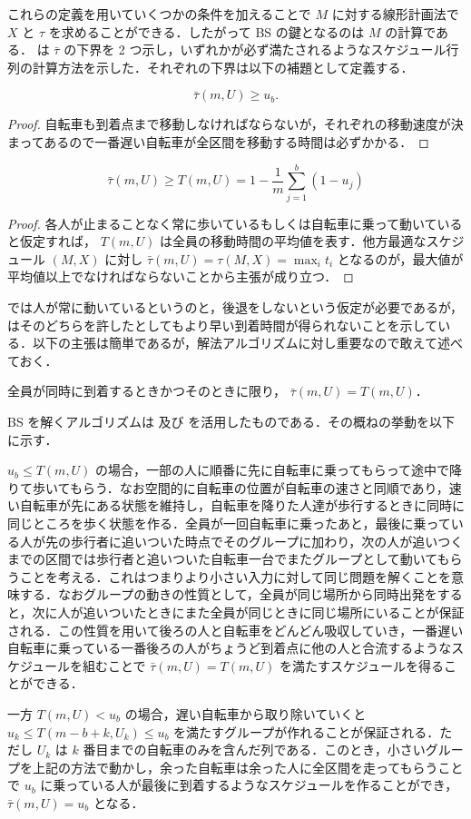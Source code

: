 これらの定義を用いていくつかの条件を加えることで $M$ に対する線形計画法で $X$ と $\tau$ を求めることができる．したがって BS の鍵となるのは $M$ の計算である． \textcite{czyzowicz} は $\bar\tau$ の下界を 2 つ示し，いずれかが必ず満たされるようなスケジュール行列の計算方法を示した．それぞれの下界は以下の補題として定義する．

\begin{lemma}
  \begin{equation}
    \bar\tau(m, U) \geq u_b.
  \end{equation}
\end{lemma}
\begin{proof}
  自転車も到着点まで移動しなければならないが，それぞれの移動速度が決まってあるので一番遅い自転車が全区間を移動する時間は必ずかかる．
\end{proof}

\begin{lemma}\label{lemma:lower-bound-bs}
  \begin{equation}
    \bar\tau(m, U) \geq T(m, U) = 1 - \frac{1}{m}\sum_{j = 1}^b(1 - u_j)
  \end{equation}
\end{lemma}
\begin{proof}
  各人が止まることなく常に歩いているもしくは自転車に乗って動いていると仮定すれば， $T(m, U)$ は全員の移動時間の平均値を表す．他方最適なスケジュール $(M, X)$ に対し $\bar\tau(m, U) = \tau(M, X) = \max_i t_i$ となるのが，最大値が平均値以上でなければならないことから主張が成り立つ．
\end{proof}
 では人が常に動いているというのと，後退をしないという仮定が必要であるが，\textcite{czyzowicz} はそのどちらを許したとしてもより早い到着時間が得られないことを示している．以下の主張は簡単であるが，解法アルゴリズムに対し重要なので敢えて述べておく．

\begin{corollary}\label{corollary:lower-bound-bs-equality}
  全員が同時に到着するときかつそのときに限り， $\bar\tau(m, U) = T(m, U)$．
\end{corollary}

BS を解くアルゴリズムは  及び  を活用したものである．その概ねの挙動を以下に示す．

$u_b \leq T(m, U)$ の場合，一部の人に順番に先に自転車に乗ってもらって途中で降りて歩いてもらう．なお空間的に自転車の位置が自転車の速さと同順であり，速い自転車が先にある状態を維持し，自転車を降りた人達が歩行するときに同時に同じところを歩く状態を作る．全員が一回自転車に乗ったあと，最後に乗っている人が先の歩行者に追いついた時点でそのグループに加わり，次の人が追いつくまでの区間では歩行者と追いついた自転車一台でまたグループとして動いてもらうことを考える．これはつまりより小さい入力に対して同じ問題を解くことを意味する．なおグループの動きの性質として，全員が同じ場所から同時出発をすると，次に人が追いついたときにまた全員が同じときに同じ場所にいることが保証される．この性質を用いて後ろの人と自転車をどんどん吸収していき，一番遅い自転車に乗っている一番後ろの人がちょうど到着点に他の人と合流するようなスケジュールを組むことで $\bar\tau(m, U) = T(m, U)$ を満たすスケジュールを得ることができる．

一方 $T(m, U) < u_b$ の場合，遅い自転車から取り除いていくと $u_k \leq T(m - b + k, U_k) \leq u_b$ を満たすグループが作れることが保証される．ただし $U_k$ は $k$ 番目までの自転車のみを含んだ列である．このとき，小さいグループを上記の方法で動かし，余った自転車は余った人に全区間を走ってもらうことで $u_b$ に乗っている人が最後に到着するようなスケジュールを作ることができ， $\bar\tau(m, U) = u_b$ となる．